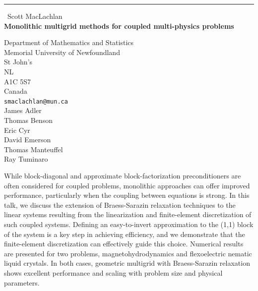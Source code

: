 \documentclass{report}
\begin{document}
\begin{center}
\rule{6in}{1pt} \
{\large Scott MacLachlan \\
{\bf Monolithic multigrid methods for coupled multi-physics problems}}

Department of Mathematics and Statistics \\ Memorial University of Newfoundland \\ St John's \\ NL \\ A1C 5S7 \\ Canada
\\
{\tt smaclachlan@mun.ca}\\
James Adler\\
Thomas Benson\\
Eric Cyr\\
David Emerson\\
Thomas Manteuffel\\
Ray Tuminaro\end{center}

While block-diagonal and approximate block-factorization preconditioners
are often considered for coupled problems, monolithic approaches can
offer improved performance, particularly when the coupling between
equations is strong. In this talk, we discuss the extension of
Braess-Sarazin relaxation techniques to the linear systems resulting from
the linearization and finite-element discretization of such coupled
systems. Defining an easy-to-invert approximation to the (1,1) block of
the system is a key step in achieving efficiency, and we demonstrate that
the finite-element discretization can effectively guide this choice.
Numerical results are presented for two problems, magnetohydrodynamics
and flexoelectric nematic liquid crystals. In both cases, geometric
multigrid with Braess-Sarazin relaxation shows excellent performance and
scaling with problem size and physical parameters.
\end{document}

